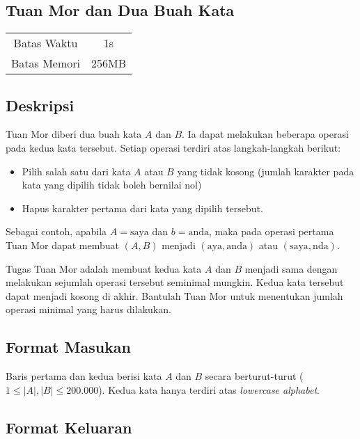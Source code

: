 \documentclass{article}
\begin{document}
\begin{center}
    \section*{Tuan Mor dan Dua Buah Kata}

    \begin{tabular}{ | c c | }
        \hline
        Batas Waktu  & 1s \\  
        Batas Memori & 256MB \\
        \hline
    \end{tabular}
\end{center}

\subsection*{Deskripsi}

Tuan Mor diberi dua buah kata $A$ dan $B$. Ia dapat melakukan beberapa operasi pada kedua kata tersebut. Setiap operasi terdiri atas langkah-langkah berikut:

\begin{itemize}
    \setlength\itemsep{0pt}
    \item Pilih salah satu dari kata $A$ atau $B$ yang tidak kosong (jumlah karakter pada kata yang dipilih tidak boleh bernilai nol)
    \item Hapus karakter pertama dari kata yang dipilih tersebut.
\end{itemize}

Sebagai contoh, apabila $A = \text{saya}$ dan $b = \text{anda}$, maka pada operasi pertama Tuan Mor dapat membuat $(A,B)$ menjadi $(\text{aya}, \text{anda})$ atau $(\text{saya}, \text{nda})$.

Tugas Tuan Mor adalah membuat kedua kata $A$ dan $B$ menjadi sama dengan melakukan sejumlah operasi tersebut seminimal mungkin. Kedua kata tersebut dapat menjadi kosong di akhir. Bantulah Tuan Mor untuk menentukan jumlah operasi minimal yang harus dilakukan.

\subsection*{Format Masukan}

Baris pertama dan kedua berisi kata $A$ dan $B$ secara berturut-turut ($1 \leq |A|, |B| \leq 200.000$). Kedua kata hanya terdiri atas \textit{lowercase alphabet}.  

\subsection*{Format Keluaran}
\end{document}
